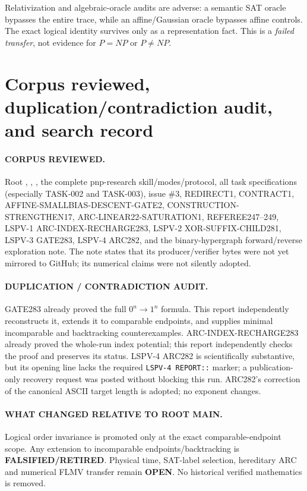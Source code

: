 \documentclass[11pt]{article}
\newcommand{\OPEN}{\textbf{OPEN}}
\newcommand{\RET}{\textbf{FALSIFIED/RETIRED}}
\begin{document}
Relativization and algebraic-oracle audits are adverse: a semantic SAT oracle bypasses
the entire trace, while an affine/Gaussian oracle bypasses affine controls.  The exact
logical identity survives only as a representation fact.  This is a \emph{failed
transfer}, not evidence for $P=NP$ or $P\ne NP$.

\section{Corpus reviewed, duplication/contradiction audit, and search record}
\paragraph{CORPUS REVIEWED.}
Root , , , the complete pnp-research
skill/modes/protocol, all task specifications (especially TASK-002 and TASK-003), issue
\#3, REDIRECT1, CONTRACT1, AFFINE-SMALLBIAS-DESCENT-GATE2,
CONSTRUCTION-STRENGTHEN17, ARC-LINEAR22-SATURATION1, REFEREE247--249, LSPV-1
ARC-INDEX-RECHARGE283, LSPV-2 XOR-SUFFIX-CHILD281, LSPV-3 GATE283, LSPV-4 ARC282,
and the binary-hypergraph forward/reverse exploration note.  The note states that its
producer/verifier bytes were not yet mirrored to GitHub; its numerical claims were not
silently adopted.

\paragraph{DUPLICATION / CONTRADICTION AUDIT.}
GATE283 already proved the full $0^n\to1^n$ formula.  This report independently
reconstructs it, extends it to comparable endpoints, and supplies minimal incomparable
and backtracking counterexamples.  ARC-INDEX-RECHARGE283 already proved the whole-run
index potential; this report independently checks the proof and preserves its status.
LSPV-4 ARC282 is scientifically substantive, but its opening line lacks the required
\texttt{LSPV-4 REPORT::} marker; a publication-only recovery request was posted without
blocking this run.  ARC282's correction of the canonical ASCII target length is adopted;
no exponent changes.

\paragraph{WHAT CHANGED RELATIVE TO ROOT MAIN.}
Logical order invariance is promoted only at the exact comparable-endpoint scope.
Any extension to incomparable endpoints/backtracking is \RET.  Physical time, SAT-label
selection, hereditary ARC and numerical FLMV transfer remain \OPEN.  No historical
verified mathematics is removed.
\end{document}
